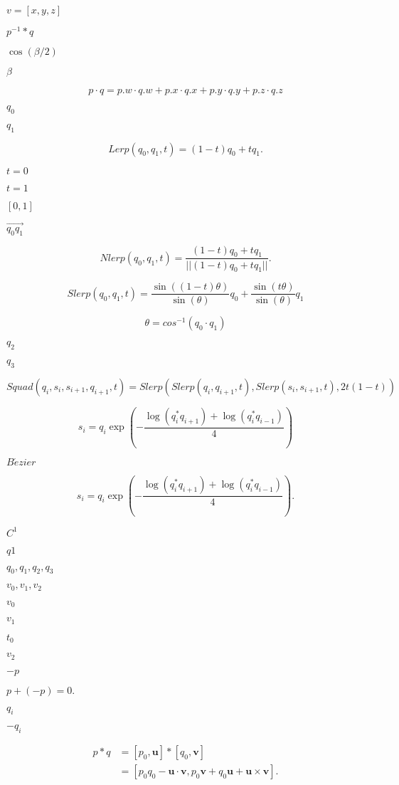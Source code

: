 \documentclass{article}
\begin{document}
$v=[x, y ,z]$
\pagebreak

$p^{-1} * q$
\pagebreak

$\cos(\beta/2)$
\pagebreak

$\beta$
\pagebreak

\[p \cdot q = p.w \cdot q.w + p.x \cdot q.x + p.y \cdot q.y + p.z \cdot q.z\]
\pagebreak

$q_0$
\pagebreak

$q_1$
\pagebreak

\[Lerp(q_0, q_1, t) = (1 - t)q_0 + tq_1.\]
\pagebreak

$t = 0$
\pagebreak

$t= 1$
\pagebreak

$[0, 1]$
\pagebreak

$\overrightarrow{q_0q_1}$
\pagebreak

\[ Nlerp(q_0, q_1, t) = \frac{(1 - t)q_0 + tq_1}{||(1 - t)q_0 + tq_1||}.\]
\pagebreak

\[ Slerp(q_0, q_1, t) = \frac{\sin((1-t)\theta)}{\sin(\theta)}q_0 + \frac{\sin(t\theta)}{\sin(\theta)}q_1\]
\pagebreak

\[\theta=cos^{-1}(q_0\cdot q_1)\]
\pagebreak

$q_2$
\pagebreak

$q_3$
\pagebreak

\[Squad(q_i, s_i, s_{i+1}, q_{i+1}, t) = Slerp(Slerp(q_i, q_{i+1}, t), Slerp(s_i, s_{i+1}, t), 2t(1-t))\]
\pagebreak

\[s_i = q_i\exp(-\frac{\log(q^*_iq_{i+1}) + \log(q^*_iq_{i-1})}{4})\]
\pagebreak

$B\acute{e}zier$
\pagebreak

\[s_i = q_i\exp(-\frac{\log(q^*_iq_{i+1}) + \log(q^*_iq_{i-1})}{4}).\]
\pagebreak

$C^1$
\pagebreak

$q1$
\pagebreak

$q_0, q_1, q_2, q_3$
\pagebreak

$v_0, v_1, v_2$
\pagebreak

$v_0$
\pagebreak

$v_1$
\pagebreak

$t_0$
\pagebreak

$v_2$
\pagebreak

$-p$
\pagebreak

$p + (-p) = 0.$
\pagebreak

$q_i$
\pagebreak

$-q_i$
\pagebreak

\[ \begin{equation} \begin{split} p * q &= [p_0, \boldsymbol{u}]*[q_0, \boldsymbol{v}]\\ &=[p_0q_0 - \boldsymbol{u}\cdot \boldsymbol{v}, p_0\boldsymbol{v} + q_0\boldsymbol{u}+ \boldsymbol{u}\times \boldsymbol{v}]. \end{split} \end{equation} \]
\pagebreak
\end{document}

